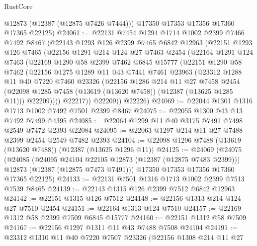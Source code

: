 \begin{lexlean}{RustCore}
\begin{coremodule}
        @12873
        (@12387 (@12875 @7426 @7444)))
      @17350
      @17353
      @17356
      @17360
      @17365
      @22125)
@24061 := @22131
    @7454
    @1294
    @1714
    @1002
    @2399
    @7466
    @7492
    @8467
    (@22143
      @1293
      @126
      @2399
      @7465
      @6842
      @12963
      (@22151
        @1293
        @126
        @7465
        (@22156
          @1291
          @214
          @124
          @27
          @7463
          @2454
          (@22164
            @1291
            @124
            @7463
            (@22169
              @1290
              @58
              @2399
              @7462
              @6845
              @15777
              (@22151
                @1290
                @58
                @7462
                (@22156
                  @1275
                  @1289
                  @11
                  @43
                  @7441
                  @7461
                  @23963
                  (@23312
                    @1288
                    @11
                    @40
                    @7220
                    @7460
                    @23326
                    (@22156
                      @1286
                      @214
                      @11
                      @27
                      @7458
                      @2454
                      (@22098 @1285 @7458 (@13619 (@13620 @7458)) (@12387 (@13625 @1285 @11)))
                      @22209))))
              @22217))
          @22209))
      @22226)
@24069 := @22044 @1301 @1316 @1713 @1002 @7492 @7501 @2399 @8467
@24075 := @22055 @1300 @43 @13 @7492 @7499 @4395
@24085 := @22064 @1299 @11 @40 @3175 @7491 @7498 @2549 @7472 @2393 @22084
@24095 := @22063 @1297 @214 @11 @27 @7488 @2399 @2454 @2549 @7482 @2393
@24104 := @22098 @1296 @7488 (@13619 (@13620 @7488)) (@12387 (@13625 @1296 @11))
@24125 := @24069
    (@24075
      (@24085
        (@24095 @24104 @22105 @12873 (@12387 (@12875 @7483 @2399)))
        @12873
        (@12387 (@12875 @7473 @7491)))
      @17350
      @17353
      @17356
      @17360
      @17365
      @22125)
@24133 := @22131 @7501 @1316 @1713 @1002 @2399 @7513 @7539 @8465
@24139 := @22143 @1315 @126 @2399 @7512 @6842 @12963
@24142 := @22151 @1315 @126 @7512
@24148 := @22156 @1313 @214 @124 @27 @7510 @2454
@24151 := @22164 @1313 @124 @7510
@24157 := @22169 @1312 @58 @2399 @7509 @6845 @15777
@24160 := @22151 @1312 @58 @7509
@24167 := @22156 @1297 @1311 @11 @43 @7488 @7508 @24104
@24191 := @23312
    @1310
    @11
    @40
    @7220
    @7507
    @23326
    (@22156
      @1308
      @214
      @11
      @27

\end{coremodule}
\end{lexlean}
